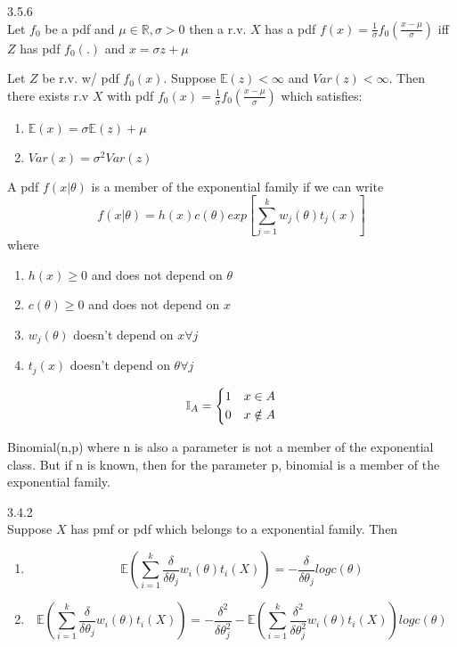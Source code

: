 \documentclass[14pt, oneside, letterpaper, fleqn]{notes}
\begin{document}
\begin{theorem} 3.5.6\\
Let $f_0$ be a pdf and $\mu \in \mathbb{R}, \sigma >0$ then 
a r.v. $X$ has a pdf $f(x) = \frac{1}{\sigma}f_0
(\frac{x- \mu}{\sigma})$ iff $Z$ has pdf $f_0(.)$
and $x=\sigma z + \mu$
\end{theorem}

\begin{theorem}
Let $Z$ be r.v. w/ pdf $f_0(x)$. Suppose $\mathbb{E}(z)<\infty$
and $Var(z)<\infty$.  Then there exists r.v $X$ with pdf
$f_0(x) = \frac{1}{\sigma}f_0 (\frac{x- \mu}{\sigma})$
which satisfies:
\begin{enumerate}
\item $\mathbb{E}(x) = \sigma \mathbb{E}(z) + \mu$
\item $Var(x) = \sigma^2Var(z)$
\end{enumerate}
\end{theorem}

\begin{mydef}
A pdf $f(x|\theta)$ is a member of the exponential family
if we can write 
\[
f(x|\theta) = h(x)c(\theta) 
exp[\sum_{j=1}^kw_j(\theta)t_j(x)]
\]
where
\begin{enumerate}
\item $h(x) \geq 0$ and does not depend on $\theta$
\item $c(\theta) \geq 0$ and does not depend on $x$
\item $w_j(\theta)$ doesn't depend on $x \forall j$
\item $t_j(x)$ doesn't depend on $\theta \forall j$ 
\end{enumerate}
\end{mydef}

\begin{mydef}
\[
\mathbb{I}_A =  
	\begin{dcases}
		1 & x \in A \\
		0 & x \notin A
	\end{dcases}
\]
\end{mydef}

\begin{remark}
Binomial(n,p) where n is also a parameter is not a member
of the exponential class.  But if n is known, then for the
parameter p, binomial is a member of the exponential family.
\end{remark}

\begin{theorem} 3.4.2 \\
Suppose $X$ has pmf or pdf which belongs to a exponential
family.  Then 
\begin{enumerate}
\item \[ \mathbb{E}(\sum_{i=1}^k \frac{\delta}{\delta \theta_j}
w_i(\theta)t_i(X)) = - \frac{\delta}{\delta \theta_j}
log c(\theta) \]

\item \[ \mathbb{E}(\sum_{i=1}^k \frac{\delta}{\delta \theta_j}
w_i(\theta)t_i(X)) = - \frac{\delta^2}{\delta \theta^2_j} - 
\mathbb{E}(\sum_{i=1}^k \frac{\delta^2}{\delta \theta^2_j}
w_i(\theta)t_i(X))
log c(\theta) \]

\end{enumerate}
\end{theorem}
\end{document}
